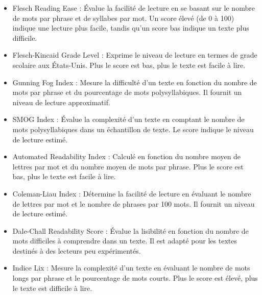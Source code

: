 \documentclass[12pt,a4paper,oneside,titlepage]{article} %
\begin{document}
\begin{itemize}
		
	\item Flesch Reading Ease : Évalue la facilité de lecture en se basant sur le nombre de mots par phrase et de syllabes par mot. Un score élevé (de 0 à 100) indique une lecture plus facile, tandis qu'un score bas indique un texte plus difficile.
	
	\item Flesch-Kincaid Grade Level : Exprime le niveau de lecture en termes de grade scolaire aux États-Unis. Plus le score est bas, plus le texte est facile à lire.
	
	\item Gunning Fog Index : Mesure la difficulté d'un texte en fonction du nombre de mots par phrase et du pourcentage de mots polysyllabiques. Il fournit un niveau de lecture approximatif.
	
	\item SMOG Index : Évalue la complexité d'un texte en comptant le nombre de mots polysyllabiques dans un échantillon de texte. Le score indique le niveau de lecture estimé.
	
	\item Automated Readability Index : Calculé en fonction du nombre moyen de lettres par mot et du nombre moyen de mots par phrase. Plus le score est bas, plus le texte est facile à lire.
	
	\item Coleman-Liau Index : Détermine la facilité de lecture en évaluant le nombre de lettres par mot et le nombre de phrases par 100 mots. Il fournit un niveau de lecture estimé.
	
	\item Dale-Chall Readability Score : Évalue la lisibilité en fonction du nombre de mots difficiles à comprendre dans un texte. Il est adapté pour les textes destinés à des lecteurs peu expérimentés.
	
	\item Indice Lix : Mesure la complexité d'un texte en évaluant le nombre de mots longs par phrase et le pourcentage de mots courts. Plus le score est élevé, plus le texte est difficile à lire.

\end{itemize}	
\end{document}
